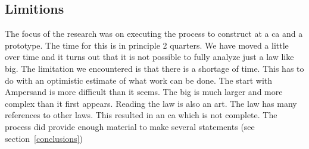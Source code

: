 \subsection{Limitions}\label{sbs:limitions}
The focus of the research was on executing the process to construct at a \acrshort{ca} and a prototype.
The time for this is in principle 2 quarters.
We have moved a little over time and it turns out that it is not possible to fully analyze just a law like \acrshort{big}.
The limitation we encountered is that there is a shortage of time.
This has to do with an optimistic estimate of what work can be done.
The start with Ampersand is more difficult than it seems.
The \acrshort{big} is much larger and more complex than it first appears.
Reading the law is also an art.
The law has many references to other laws.
This resulted in an \acrshort{ca} which is not complete.
The process did provide enough material to make several statements (see section~\ref{conclusions})

